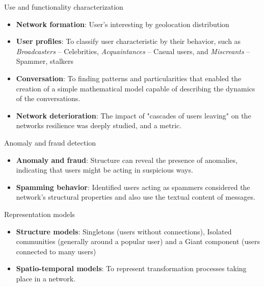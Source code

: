\documentclass[8pt]{beamer}
\begin{document}
  \begin{frame}{Use and functionality characterization}
    \begin{itemize}
      \item \textbf{Network formation}: User's interesting by geolocation distribution
      
      \item \textbf{User profiles}: To classify user characteristic by their behavior, such as \textit{Broadcasters} -- Celebrities, \textit{Acquaintances} -- Casual users, and \textit{Miscreants} -- Spammer, stalkers
      
      \item \textbf{Conversation}: To finding patterns and particularities that enabled the creation of a simple mathematical model capable of describing the dynamics of the conversations.
      
      \item \textbf{Network deterioration}: The impact of "cascades of users leaving" on the networks resilience was deeply studied, and a metric.
      
    \end{itemize}
  \end{frame}

  \begin{frame}{Anomaly and fraud detection}
    \begin{itemize}
      \item \textbf{Anomaly and fraud}: Structure can reveal the presence of anomalies, indicating that users might be acting in suspicious ways.
      
      \item \textbf{Spamming behavior}: Identified users acting as spammers considered the network's structural properties and also use the textual content of messages.
    \end{itemize}
  \end{frame}

  \begin{frame}{Representation models}
    \begin{itemize}
      \item \textbf{Structure models}: Singletons (users without connections), Isolated communities (generally around a popular user) and a Giant component (users connected to many users)
      
      \item \textbf{Spatio-temporal models}: To represent transformation processes taking place in a network.
    \end{itemize}
  \end{frame}
\end{document}
